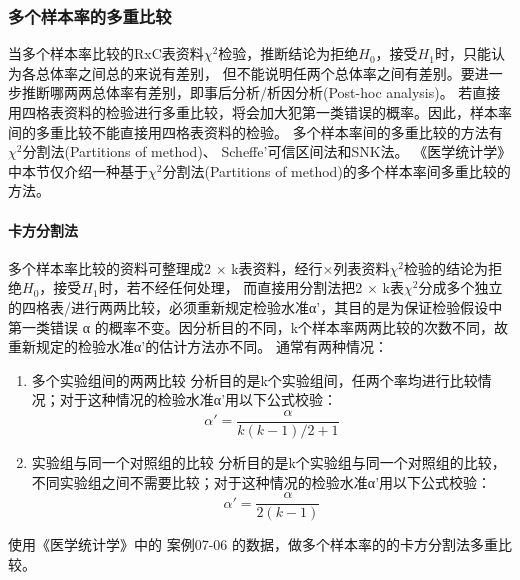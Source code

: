 \documentclass[
]{article}
\providecommand{\tightlist}{%
  \setlength{\itemsep}{0pt}\setlength{\parskip}{0pt}}
\begin{document}
\hypertarget{ux591aux4e2aux6837ux672cux7387ux7684ux591aux91cdux6bd4ux8f83}{%
\subsubsection{多个样本率的多重比较}\label{ux591aux4e2aux6837ux672cux7387ux7684ux591aux91cdux6bd4ux8f83}}

当多个样本率比较的RxC表资料\(\chi^2\)检验，推断结论为拒绝\(H_0\)，接受\(H_1\)时，只能认为各总体率之间总的来说有差别，
但不能说明任两个总体率之间有差别。要进一步推断哪两两总体率有差别，即事后分析/析因分析(Post-hoc analysis)。
若直接用四格表资料的检验进行多重比较，将会加大犯第一类错误的概率。因此，样本率间的多重比较不能直接用四格表资料的检验。
多个样本率间的多重比较的方法有\(\chi^2\)分割法(Partitions of method)、 Scheffe'可信区间法和SNK法。
《医学统计学》中本节仅介绍一种基于\(\chi^2\)分割法(Partitions of method)的多个样本率间多重比较的方法。

\hypertarget{ux5361ux65b9ux5206ux5272ux6cd5}{%
\paragraph{卡方分割法}\label{ux5361ux65b9ux5206ux5272ux6cd5}}

多个样本率比较的资料可整理成2 × k表资料，经行×列表资料\(\chi^2\)检验的结论为拒绝\(H_0\)，接受\(H_1\)时，若不经任何处理，
而直接用分割法把2 × k表\(\chi^2\)分成多个独立的四格表/进行两两比较，必须重新规定检验水准α'，其目的是为保证检验假设中
第一类错误 α 的概率不变。因分析目的不同，k个样本率两两比较的次数不同，故重新规定的检验水准α'的估计方法亦不同。
通常有两种情况：

\begin{enumerate}
\def\labelenumi{\arabic{enumi}.}
\tightlist
\item
  多个实验组间的两两比较
  分析目的是k个实验组间，任两个率均进行比较情况；对于这种情况的检验水准α'用以下公式校验：
  \[\alpha'=\frac{\alpha}{k(k-1)/2+1}\]
\item
  实验组与同一个对照组的比较
  分析目的是k个实验组与同一个对照组的比较，不同实验组之间不需要比较；对于这种情况的检验水准α'用以下公式校验：
  \[\alpha'=\frac{\alpha}{2(k-1)}\]
\end{enumerate}

使用《医学统计学》中的 案例07-06 的数据，做多个样本率的的卡方分割法多重比较。
\end{document}
